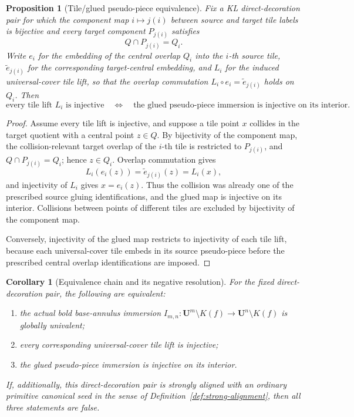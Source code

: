 \documentclass[11pt,reqno]{amsart}
\newtheorem{proposition}[theorem]{Proposition}
\newtheorem{corollary}[theorem]{Corollary}
\theoremstyle{definition}
\theoremstyle{remark}
\begin{document}
\begin{proposition}[Tile/glued pseudo-piece equivalence]
\label{prop:tile-glue-equivalence}
Fix a KL direct-decoration pair for which the component map
\(i\mapsto j(i)\) between source and target tile labels is bijective
and every target component \(P_{j(i)}\) satisfies
\[
 Q\cap P_{j(i)}=Q_i .
\]
Write \(e_i\) for the embedding of the central overlap \(Q_i\) into
the \(i\)-th source tile, \(\widetilde e_{j(i)}\) for the
corresponding target-central embedding, and \(L_i\) for the induced
universal-cover tile lift, so that the overlap commutation
\(L_i\circ e_i=\widetilde e_{j(i)}\) holds on \(Q_i\).  Then
\[
 \text{every tile lift }L_i\text{ is injective}
 \quad\Longleftrightarrow\quad
 \text{the glued pseudo-piece immersion is injective on its interior}.
\]
\end{proposition}

\begin{proof}
Assume every tile lift is injective, and suppose a tile point \(x\)
collides in the target quotient with a central point \(z\in Q\).  By
bijectivity of the component map, the collision-relevant target
overlap of the \(i\)-th tile is restricted to \(P_{j(i)}\), and
\(Q\cap P_{j(i)}=Q_i\); hence \(z\in Q_i\).  Overlap commutation gives
\[
 L_i(e_i(z))=\widetilde e_{j(i)}(z)=L_i(x),
\]
and injectivity of \(L_i\) gives \(x=e_i(z)\).  Thus the collision was
already one of the prescribed source gluing identifications, and the
glued map is injective on its interior.  Collisions between points of
different tiles are excluded by bijectivity of the component map.

Conversely, injectivity of the glued map restricts to injectivity of
each tile lift, because each universal-cover tile embeds in its source
pseudo-piece before the prescribed central overlap identifications are
imposed.
\end{proof}
\begin{corollary}[Equivalence chain and its negative resolution]
\label{cor:equivalence-chain}
For the fixed direct-decoration pair, the following are equivalent:
\begin{enumerate}
\item the actual bold base-annulus immersion
      \(I_{m,n}:\mathbf U^{m}\setminus K(f)\to
      \mathbf U^{n}\setminus K(f)\) is globally univalent;
\item every corresponding universal-cover tile lift is injective;
\item the glued pseudo-piece immersion is injective on its
      interior.
\end{enumerate}
If, additionally, this direct-decoration pair is strongly aligned with
an ordinary primitive canonical seed in the sense of
Definition~\ref{def:strong-alignment}, then all three statements are
false.
\end{corollary}
\end{document}
